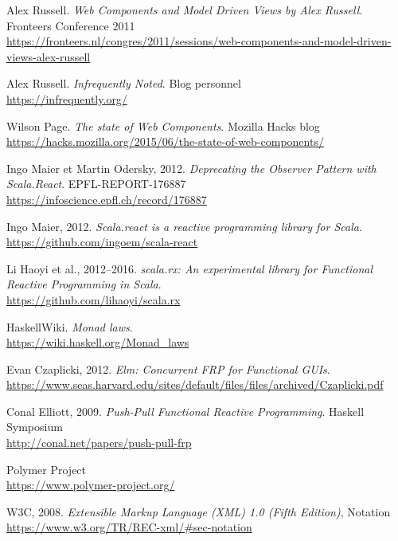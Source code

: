 \renewcommand\bibname{Références}
\begin{thebibliography}{99}

Alex Russell.
\emph{Web Components and Model Driven Views by Alex Russell}.
Fronteers Conference 2011\\
\url{https://fronteers.nl/congres/2011/sessions/web-components-and-model-driven-views-alex-russell}

Alex Russell.
\emph{Infrequently Noted}.
Blog personnel\\
\url{https://infrequently.org/}

Wilson Page.
\emph{The state of Web Components}.
Mozilla Hacks blog\\
\url{https://hacks.mozilla.org/2015/06/the-state-of-web-components/}

Ingo Maier et Martin Odersky, 2012.
\emph{Deprecating the Observer Pattern with Scala.React}.
EPFL-REPORT-176887\\
\url{https://infoscience.epfl.ch/record/176887}

Ingo Maier, 2012.
\emph{Scala.react is a reactive programming library for Scala}.\\
\url{https://github.com/ingoem/scala-react}

Li Haoyi et al., 2012--2016.
\emph{scala.rx: An experimental library for Functional Reactive Programming in Scala}.\\
\url{https://github.com/lihaoyi/scala.rx}

HaskellWiki.
\emph{Monad laws}.\\
\url{https://wiki.haskell.org/Monad_laws}

Evan Czaplicki, 2012.
\emph{Elm: Concurrent FRP for Functional GUIs}.
\\
\url{https://www.seas.harvard.edu/sites/default/files/files/archived/Czaplicki.pdf}

Conal Elliott, 2009.
\emph{Push-Pull Functional Reactive Programming}.
Haskell Symposium\\
\url{http://conal.net/papers/push-pull-frp}

Polymer Project\\
\url{https://www.polymer-project.org/}

W3C, 2008. \emph{Extensible Markup Language (XML) 1.0 (Fifth Edition)}, Notation\\
\url{https://www.w3.org/TR/REC-xml/#sec-notation}


\end{thebibliography}
